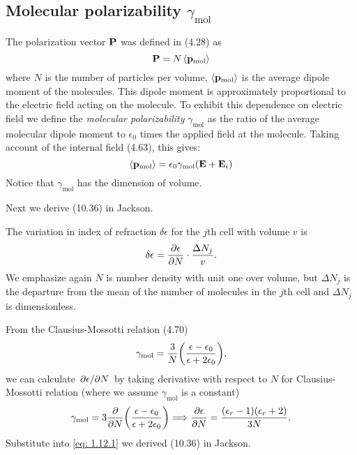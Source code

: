 \documentclass[10pt]{article}
\begin{document}
\subsection{Molecular polarizability $\gamma_{\mathrm{mol}}$}
The polarization vector $\vb{P}$ was defined in (4.28) as
\begin{equation}
	\vb{P} = N \ev{\vb{p}_{\mathrm{mol}}}
\end{equation}
where $N$ is the number of particles per volume, $\ev{\vb{p}_{\mathrm{mol}}}$ is the average dipole moment of the molecules. This dipole moment is approximately proportional to the electric field acting on the molecule. To exhibit this dependence on electric field we define the \textit{molecular polarizability} $\gamma_{\mathrm{mol}}$ as the ratio of the average molecular dipole moment to $\epsilon_0$ times the applied field at the molecule. Taking account of the internal field (4.63), this gives:
\begin{equation}
	\ev{\vb{p}_{\mathrm{mol}}} = \epsilon_0 \gamma_{\mathrm{mol}} (\vb{E} + \vb{E}_i)
\end{equation}
Notice that $\gamma_{\mathrm{mol}}$ has the dimension of volume.

Next we derive (10.36) in Jackson.

The variation in index of refraction $\delta \epsilon$ for the $j$th cell with volume $v$ is
\begin{equation}
	\delta \epsilon = \pdv{\epsilon}{N} \cdot \frac{\Delta N_j}{v}. \label{eq: 1.12.1}
\end{equation}
We emphasize again $N$ is number density with unit one over volume, but $\Delta N_j$ is the departure from the mean of the number of molecules in the $j$th cell and $\Delta N_j$ is dimensionless.

From the Clausius-Mossotti relation (4.70)
\begin{equation*}
	\gamma_{\mathrm{mol}} = \frac{3}{N} \qty(\frac{\epsilon - \epsilon_0}{\epsilon + 2 \epsilon_0}),
\end{equation*}
we can calculate $\pdv*{\epsilon}{N}$ by taking derivative with respect to $N$ for Clausius-Mossotti relation (where we assume $\gamma_{\mathrm{mol}}$ is a constant)
\begin{gather*}
	\gamma_{\mathrm{mol}} = 3 \pdv{N} \qty(\frac{\epsilon - \epsilon_0}{\epsilon + 2 \epsilon_0}) \Longrightarrow \pdv{\epsilon}{N} = \frac{(\epsilon_r - 1)(\epsilon_r + 2)}{3N}.
\end{gather*}
Substitute into \eqref{eq: 1.12.1} we derived (10.36) in Jackson.
\end{document}
